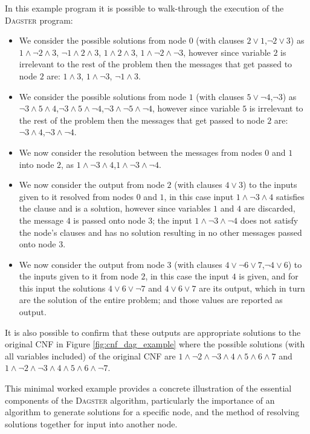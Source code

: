 \documentclass[
10pt, %
a4paper, %
oneside, %
headinclude,footinclude, %
BCOR5mm, %
]{scrartcl}
\begin{document}
In this example program it is possible to walk-through the execution of the \textsc{Dagster} program:
\begin{itemize}[noitemsep]
\item	We consider the possible solutions from node $0$ (with clauses $2\lor 1$,$\neg 2\lor 3$) as $1\land \neg 2\land 3$, $\neg 1\land 2\land 3$, $1\land 2\land 3$, $1\land \neg 2\land \neg 3$, 
however since variable $2$ is irrelevant to the rest of the problem then the messages that get passed to node $2$ are: $1\land 3$, $1\land \neg 3$, $\neg 1\land 3$.
\item	We consider the possible solutions from node $1$ (with clauses $5\lor \neg 4$,$\neg 3$) as $\neg 3\land 5\land 4$,$\neg 3\land 5\land \neg 4$,$\neg 3\land \neg 5\land \neg 4$, however 
since variable $5$ is irrelevant to the rest of the problem then the messages that get passed to node $2$ are: $\neg 3\land 4$,$\neg 3\land \neg 4$.
\item	We now consider the resolution between the messages from nodes $0$ and $1$ into node $2$, as $1\land \neg 3\land 4$,$1\land \neg 3\land \neg 4$.
\item	We now consider the output from node $2$ (with clauses $4\lor 3$) to the inputs given to it resolved from nodes $0$ and $1$, in this case input $1\land \neg 3\land 4$ satisfies the clause and
is a solution, however since variables $1$ and $4$ are discarded, the message $4$ is passed onto node $3$; the input $1\land \neg 3\land \neg 4$ does not satisfy the node's clauses and has no solution
resulting in no other messages passed onto node $3$.
\item	We now consider the output from node $3$ (with clauses $4\lor\neg 6\lor 7$,$\neg 4\lor 6$) to the inputs given to it from node $2$, in this case the input $4$ is given, and for this input
the solutions $4\lor 6\lor\neg 7$ and $4\lor 6\lor 7$ are its output, which in turn are the solution of the entire problem; and those values are reported as output.
\end{itemize}

It is also possible to confirm that these outputs are appropriate solutions to the original CNF in Figure \ref{fig:cnf_dag_example} where the possible solutions (with all variables included)
of the original CNF are $1\land\neg 2\land\neg 3\land 4\land 5\land 6\land 7$ and $1\land\neg 2\land\neg 3\land 4\land 5\land 6\land\neg 7$.

This minimal worked example provides a concrete illustration of the essential components of the \textsc{Dagster} algorithm, particularly the importance of an algorithm to generate solutions for a specific
node, and the method of resolving solutions together for input into another node.
\end{document}
